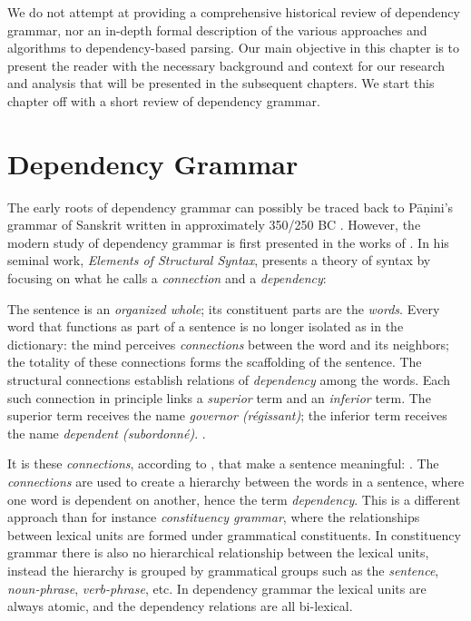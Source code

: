 We do not attempt at providing a comprehensive historical review of dependency grammar, nor an in-depth formal description of the various approaches and algorithms to dependency-based parsing. Our main objective in this chapter is to present the reader with the necessary background and context for our research and analysis that will be presented in the subsequent chapters. We start this chapter off with a short review of dependency grammar.

\section{Dependency Grammar}
\label{grammar}

The early roots of dependency grammar can possibly be traced back to P\={a}\d{n}ini's grammar of Sanskrit written in approximately 350/250 BC \cite{Kruijff:02}. However, the modern study of  dependency grammar is first presented in the works of \citeauthor{Tes:15}. In his seminal work, \textit{Elements of Structural Syntax}, \citeauthor{Tes:15} presents a theory of syntax by focusing on what he calls a \textit{connection} and a \textit{dependency}:

\begin{displayquote}
The sentence is an \textit{organized whole}; its constituent parts are the \textit{words}. Every word that functions as part of a sentence is no longer isolated as in the dictionary: the mind perceives \textit{connections} between the word and its neighbors; the totality of these connections forms the scaffolding of the sentence. The structural connections establish relations of \textit{dependency} among the words. Each such connection in principle links a \textit{superior} term and an \textit{inferior} term. The superior term receives the name \textit{governor (r\'{e}gissant)}; the inferior term receives the name \textit{dependent (subordonn\'{e})}. \cite{Tes:15}.
\end{displayquote}

It is these \textit{connections}, according to \citeauthor{Tes:15}, that make a sentence meaningful:  \cite{Tes:15}. The \textit{connections} are used to create a hierarchy between the words in a sentence, where one word is dependent on another, hence the term \textit{dependency}. This is a different approach than for instance \textit{constituency grammar}, where the relationships between lexical units are formed under grammatical constituents. In constituency grammar there is also no hierarchical relationship between the lexical units, instead the hierarchy is grouped by grammatical groups such as the \textit{sentence}, \textit{noun-phrase}, \textit{verb-phrase}, etc. In dependency grammar the lexical units are always atomic, and the dependency relations are all bi-lexical.

